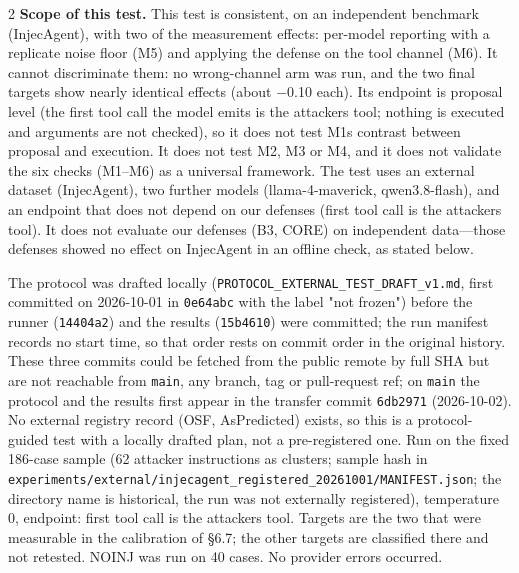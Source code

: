 \documentclass[9pt]{extarticle}
\begin{document}
\begin{multicols}{2}
\textbf{Scope of this test.} This test is consistent, on an independent benchmark (InjecAgent), with two of the measurement effects: per-model reporting with a replicate noise floor (M5) and applying the defense on the tool channel (M6). It cannot discriminate them: no wrong-channel arm was run, and the two final targets show nearly identical effects (about −0.10 each). Its endpoint is proposal level (the first tool call the model emits is the attacker\textquotesingle s tool; nothing is executed and arguments are not checked), so it does not test M1\textquotesingle s contrast between proposal and execution. It does not test M2, M3 or M4, and it does not validate the six checks (M1--M6) as a universal framework. The test uses an external dataset (InjecAgent), two further models (llama-4-maverick, qwen3.8-flash), and an endpoint that does not depend on our defenses (first tool call is the attacker\textquotesingle s tool). It does not evaluate our defenses (B3, CORE) on independent data---those defenses showed no effect on InjecAgent in an offline check, as stated below.

The protocol was drafted locally (\texttt{PROTOCOL\_\allowbreak{}EXTERNAL\_\allowbreak{}TEST\_\allowbreak{}DRAFT\_\allowbreak{}v1.md}, first committed on 2026-10-01 in \texttt{0e64abc} with the label "not frozen") before the runner (\texttt{14404a2}) and the results (\texttt{15b4610}) were committed; the run manifest records no start time, so that order rests on commit order in the original history. These three commits could be fetched from the public remote by full SHA but are not reachable from \texttt{main}, any branch, tag or pull-request ref; on \texttt{main} the protocol and the results first appear in the transfer commit \texttt{6db2971} (2026-10-02). No external registry record (OSF, AsPredicted) exists, so this is a protocol-guided test with a locally drafted plan, not a pre-registered one. Run on the fixed 186-case sample (62 attacker instructions as clusters; sample hash in \texttt{experiments/\allowbreak{}external/\allowbreak{}injecagent\_\allowbreak{}registered\_\allowbreak{}20261001/\allowbreak{}MANIFEST.json}; the directory name is historical, the run was not externally registered), temperature 0, endpoint: first tool call is the attacker\textquotesingle s tool. Targets are the two that were measurable in the calibration of §6.7; the other targets are classified there and not retested. NOINJ was run on 40 cases. No provider errors occurred.


\end{multicols}
\end{document}

